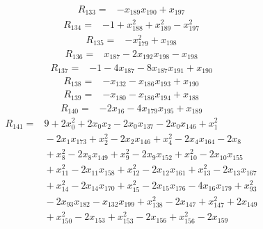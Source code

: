 {%
\begin{align*}
R_{133} ={}& -x_{189} x_{190} + x_{197}
\end{align*}
\begin{align*}
R_{134} ={}& -1 + x_{188}^{2} + x_{189}^{2} - x_{197}^{2}
\end{align*}
\begin{align*}
R_{135} ={}& -x_{179}^{2} + x_{198}
\end{align*}
\begin{align*}
R_{136} ={}& x_{187} - 2x_{192} x_{198} - x_{198}
\end{align*}
\begin{align*}
R_{137} ={}& -1 - 4x_{187} - 8x_{187} x_{191} + x_{190}
\end{align*}
\begin{align*}
R_{138} ={}& -x_{132} - x_{186} x_{193} + x_{190}
\end{align*}
\begin{align*}
R_{139} ={}& -x_{180} - x_{186} x_{194} + x_{188}
\end{align*}
\begin{align*}
R_{140} ={}& -2x_{16} - 4x_{179} x_{195} + x_{189}
\end{align*}
\begin{align*}
R_{141} ={}& 9 + 2x_{0}^{2} + 2x_{0} x_{2} - 2x_{0} x_{137} - 2x_{0} x_{146} + x_{1}^{2} \\
&{}  - 2x_{1} x_{173} + x_{2}^{2} - 2x_{2} x_{146} + x_{4}^{2} - 2x_{4} x_{164} - 2x_{8} \\
&{}  + x_{8}^{2} - 2x_{8} x_{149} + x_{9}^{2} - 2x_{9} x_{152} + x_{10}^{2} - 2x_{10} x_{155} \\
&{}  + x_{11}^{2} - 2x_{11} x_{158} + x_{12}^{2} - 2x_{12} x_{161} + x_{13}^{2} - 2x_{13} x_{167} \\
&{}  + x_{14}^{2} - 2x_{14} x_{170} + x_{15}^{2} - 2x_{15} x_{176} - 4x_{16} x_{179} + x_{93}^{2} \\
&{}  - 2x_{93} x_{182} - x_{132} x_{199} + x_{138}^{2} - 2x_{147} + x_{147}^{2} + 2x_{149} \\
&{}  + x_{150}^{2} - 2x_{153} + x_{153}^{2} - 2x_{156} + x_{156}^{2} - 2x_{159} \\

\end{align*}}
